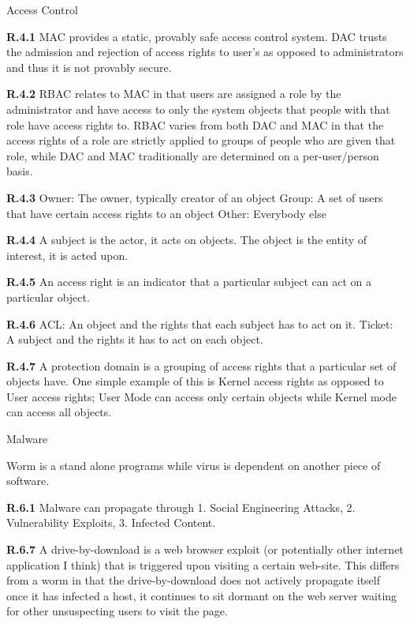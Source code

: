 \documentclass{report}
\begin{document}
\large{Access Control}

{\bf R.4.1} MAC provides a static, provably safe access control system. DAC
trusts the admission and rejection of access rights to user's as opposed to
administrators and thus it is not provably secure.

{\bf R.4.2} RBAC relates to MAC in that users are assigned a role by the
administrator and have access to only the system objects that people with that
role have access rights to. RBAC varies from both DAC and MAC in that the access
rights of a role are strictly applied to groups of people who are given that
role, while DAC and MAC traditionally are determined on a per-user/person basis.

{\bf R.4.3} 
Owner: The owner, typically creator of an object
Group: A set of users that have certain access rights to an object
Other: Everybody else

{\bf R.4.4} A subject is the actor, it acts on objects. The object is the entity
of interest, it is acted upon.

{\bf R.4.5} An access right is an indicator that a particular subject can act on
a particular object.

{\bf R.4.6}
ACL: An object and the rights that each subject has to act on it.
Ticket: A subject and the rights it has to act on each object.

{\bf R.4.7}
A protection domain is a grouping of access rights that a particular set of
objects have. One simple example of this is Kernel access rights as opposed to
User access rights; User Mode can access only certain objects while Kernel mode
can access all objects.


\large{Malware}

Worm is a stand alone programs while virus is dependent on another piece of
software.

{\bf R.6.1} Malware can propagate through 
1. Social Engineering Attacks, 
2. Vulnerability Exploits, 
3. Infected Content.

{\bf R.6.7} A drive-by-download is a web browser exploit (or potentially other
internet application I think) that is triggered upon visiting a certain
web-site. This differs from a worm in that the drive-by-download does not
actively propagate itself once it has infected a host, it continues to sit
dormant on the web server waiting for other unsuspecting users to visit the
page.
\end{document}
